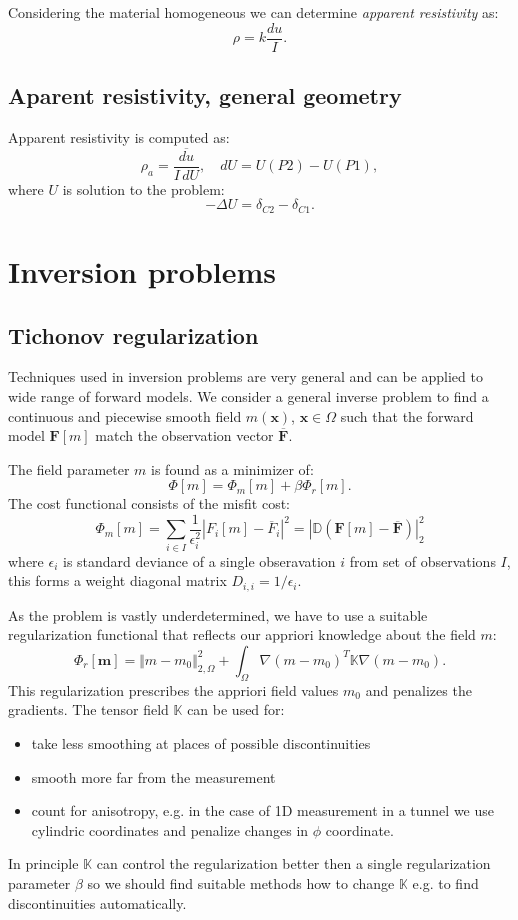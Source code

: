 \documentclass[a4paper, 12pt]{book}
\theoremstyle{definition}
\def\Lapl{\Delta}
\def\grad{\nabla}
\def\vc#1{\mathbf{\boldsymbol{#1}}}     %
\def\tn#1{{\mathbb{#1}}}    %
\def\norm#1{\bigl\Vert#1\bigr\Vert} %
\begin{document}
Considering the material homogeneous we can determine \emph{apparent resistivity} as:
\[
    \rho = k\frac{du}{I}.
\]

\subsection{Aparent resistivity, general geometry}
Apparent resistivity is computed as:
\[
    \rho_a = \frac{\overline{du}}{I\, dU}, \quad dU = U(P2) - U(P1), 
\]
where $U$ is solution to the problem:
\[
   -\Lapl U = \delta_{C2} - \delta_{C1}.
\]




\section{Inversion problems}


\subsection{Tichonov regularization}
Techniques used in inversion problems are very general and can be applied to wide range of forward models. We consider a general inverse problem
to find a continuous and piecewise smooth field $m(\vc x)$, $\vc x\in \Omega$ such that the forward model $\vc F[m]$ match the observation vector $\overline{\vc F}$.

The field parameter $m$ is found  as a minimizer of:
\[
    \Phi[m] = \Phi_m[m] + \beta\Phi_r[m].
\]
The cost functional consists of the misfit cost:
\[
    \Phi_m[m] = \sum_{i\in I} \frac{1}{\epsilon_i^2} |F_i[m] - \overline{F}_i|^2 = |\tn D (\vc F[m] - \overline{\vc F})|_2^2
\]
where $\epsilon_i$ is standard deviance of a single obseravation $i$ from set of observations $I$, this forms a weight diagonal matrix $D_{i,i} = 1/\epsilon_i$.

As the problem is vastly underdetermined, we have to use a suitable regularization functional that reflects our appriori knowledge about the field $m$:
\[
    \Phi_r[\vc m] = \norm{ m - m_0}_{2,\Omega}^2 + \int_\Omega \grad (m - m_0)^T \tn K \grad (m - m_0).
\]
This regularization prescribes the appriori field values $m_0$ and penalizes the gradients. The tensor field $\tn K$ can be used for:
\begin{itemize}
 \item take less smoothing at places of possible discontinuities
 \item smooth more far from the measurement
 \item count for anisotropy, e.g. in the case of 1D measurement in a tunnel we use cylindric coordinates and
 penalize changes in $\phi$ coordinate.
\end{itemize}
In principle $\tn K$ can control the regularization better then a single regularization parameter $\beta$ so we should
find suitable methods how to change $\tn K$ e.g. to find discontinuities automatically.
\end{document}

